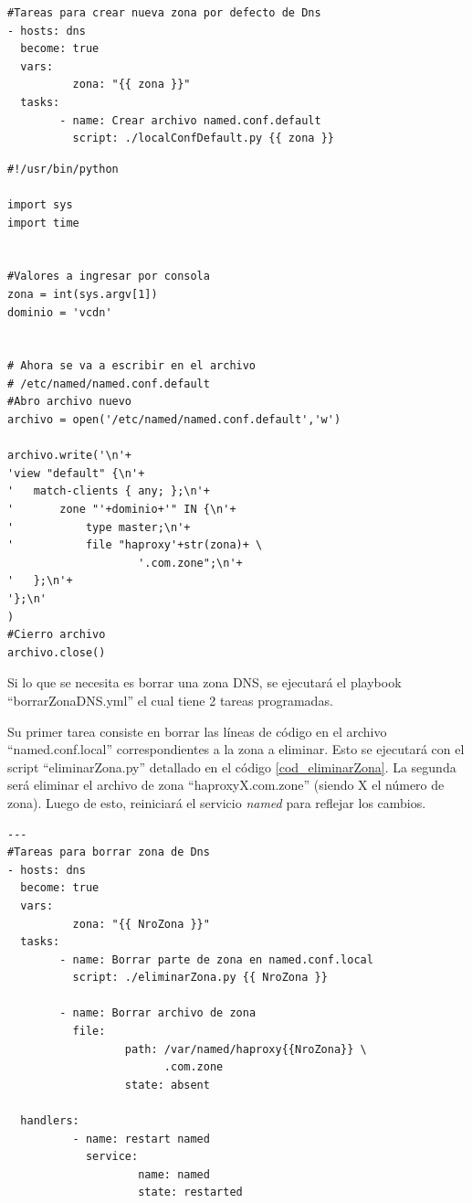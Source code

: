 \documentclass[12pt,a4paper,oneside]{book}
\begin{document}
\vspace{0.5cm}

\begin{lstlisting}[style=codigobase,  caption= crearZonaPorDefecto.yml]
#Tareas para crear nueva zona por defecto de Dns
- hosts: dns
  become: true
  vars:
          zona: "{{ zona }}"
  tasks:
        - name: Crear archivo named.conf.default
          script: ./localConfDefault.py {{ zona }}

\end{lstlisting}

\vspace{0,5cm}

\begin{lstlisting}[style=codigobase,  caption= localConfDefault.py]
#!/usr/bin/python

import sys
import time


#Valores a ingresar por consola
zona = int(sys.argv[1])
dominio = 'vcdn'


# Ahora se va a escribir en el archivo 
# /etc/named/named.conf.default
#Abro archivo nuevo
archivo = open('/etc/named/named.conf.default','w')

archivo.write('\n'+
'view "default" {\n'+
'	match-clients { any; };\n'+
'		zone "'+dominio+'" IN {\n'+
'			type master;\n'+
'			file "haproxy'+str(zona)+ \ 
                    '.com.zone";\n'+
'	};\n'+
'};\n'
)
#Cierro archivo
archivo.close()

\end{lstlisting}

\vspace{0,5cm}

Si lo que se necesita es borrar una zona DNS, se ejecutará el playbook ``borrarZonaDNS.yml'' el cual tiene 2 tareas programadas.

\vspace{0.5cm}

Su primer tarea consiste en borrar las líneas de código en el archivo ``named.conf.local'' correspondientes a la zona a eliminar. Esto se ejecutará con el script ``eliminarZona.py'' detallado en el código \ref{cod_eliminarZona}.
La segunda será eliminar el archivo de zona ``haproxyX.com.zone'' (siendo X el número de zona). Luego de esto, reiniciará el servicio \textit{named} para reflejar los cambios.

\vspace{0,5cm}

\begin{lstlisting}[style=codigobase,  caption= borrarZonaDNS.yml]
---
#Tareas para borrar zona de Dns
- hosts: dns
  become: true
  vars:
          zona: "{{ NroZona }}"
  tasks:
        - name: Borrar parte de zona en named.conf.local
          script: ./eliminarZona.py {{ NroZona }}

        - name: Borrar archivo de zona 
          file:
                  path: /var/named/haproxy{{NroZona}} \
                        .com.zone
                  state: absent

  handlers:
          - name: restart named
            service:
                    name: named
                    state: restarted       
\end{lstlisting}
\end{document}
